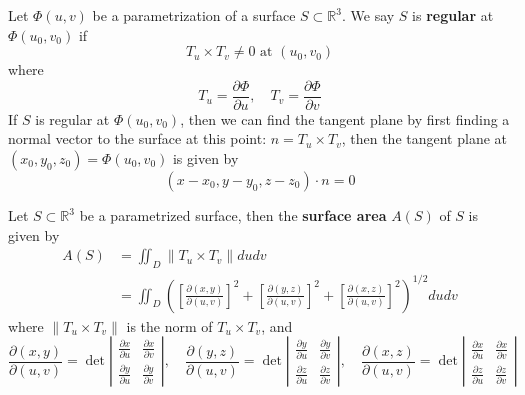 \documentclass[openany]{book}
\newcommand{\R}{\mathbb{R}}
\begin{document}
\begin{defn}
    Let $\Phi(u,v)$ be a parametrization of a surface $S\subset\R^3$.
    We say $S$ is \textbf{regular} at $\Phi(u_0,v_0)$ if 
    \begin{equation*}
        T_u\times T_v\neq 0 \text{ at } (u_0,v_0)
    \end{equation*}
    where 
    \begin{equation*}
        T_u=\frac{\partial\Phi}{\partial u}, \quad T_v=\frac{\partial\Phi}{\partial v}
    \end{equation*}
    If $S$ is regular at $\Phi(u_0,v_0)$, then we can find the tangent plane by first finding a normal vector to the surface at this point: $n=T_u\times T_v$, then the tangent plane at $(x_0, y_0, z_0)=\Phi(u_0, v_0)$ is given by 
    \begin{equation*}
        (x-x_0, y-y_0, z-z_0)\cdot n=0
    \end{equation*}
\end{defn}

\begin{defn}
    Let $S\subset\R^3$ be a parametrized surface, then the \textbf{surface area} $A(S)$ of $S$ is given by 
    \begin{align*}
        A(S)&=\iint_D\|T_u\times T_v\|dudv\\
        &=\iint_D\left(\left[\frac{\partial(x,y)}{\partial(u,v)}\right]^2+\left[\frac{\partial(y,z)}{\partial(u,v)}\right]^2+\left[\frac{\partial(x,z)}{\partial(u,v)}\right]^2\right)^{1/2}dudv
    \end{align*}
    where $\|T_u\times T_v\|$ is the norm of $T_u\times T_v$, and 
    \begin{equation*}
        \frac{\partial(x,y)}{\partial(u,v)}=\det\left|\begin{matrix}
            \frac{\partial x}{\partial u}&\frac{\partial x}{\partial v}\\
            \frac{\partial y}{\partial u}&\frac{\partial y}{\partial v}
        \end{matrix}\right|, \quad \frac{\partial(y,z)}{\partial(u,v)}=\det\left|\begin{matrix}
            \frac{\partial y}{\partial u}&\frac{\partial y}{\partial v}\\
            \frac{\partial z}{\partial u}&\frac{\partial z}{\partial v}
        \end{matrix}\right|, \quad \frac{\partial(x,z)}{\partial(u,v)}=\det\left|\begin{matrix}
            \frac{\partial x}{\partial u}&\frac{\partial x}{\partial v}\\
            \frac{\partial z}{\partial u}&\frac{\partial z}{\partial v}
        \end{matrix}\right|
    \end{equation*}
\end{defn}
\end{document}
